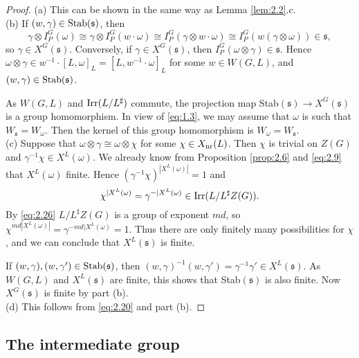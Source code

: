 \documentclass[11pt]{amsart}
\theoremstyle{definition}
\begin{document}
\begin{proof}
(a) This can be shown in the same way as Lemma \ref{lem:2.2}.c. \\
(b) If $(w,\gamma) \in {{\rm Stab}} ({{\mathfrak s}})$, then 
\[
\gamma \otimes I_P^G (\omega) \cong \gamma \otimes I_P^G (w \cdot \omega) \cong
I_P^G (\gamma \otimes w \cdot \omega) \cong I_P^G (w (\gamma \otimes \omega)) \in {{\mathfrak s}} ,
\]
so $\gamma \in X^G ({{\mathfrak s}})$. Conversely, if $\gamma \in X^G ({{\mathfrak s}})$, then 
$I_P^G (\omega \otimes \gamma) \in {{\mathfrak s}}$. Hence 
$\omega \otimes \gamma \in w^{-1} \cdot [L,\omega]_L = [L,w^{-1} \cdot \omega]_L$
for some $w \in W(G,L)$, and $(w,\gamma) \in {{\rm Stab}} ({{\mathfrak s}})$. 

As $W(G,L)$ and ${{\rm Irr}} (L / L^\sharp)$ commute, the projection map Stab$({{\mathfrak s}}) \to X^G ({{\mathfrak s}})$ 
is a group homomorphism. In view of \eqref{eq:1.3}, we may assume that $\omega$ is such 
that $W_{{\mathfrak s}} = W_\omega$. Then the kernel of this group homomorphism is $W_\omega = W_{{\mathfrak s}}$. \\
(c) Suppose that $\omega \otimes \gamma \cong \omega \otimes \chi$ for some 
$\chi \in X_{{\rm nr}}(L)$. Then $\chi$ is trivial on $Z(G)$ and $\gamma^{-1} \chi \in 
X^L (\omega)$. We already know from Proposition \ref{prop:2.6} and \eqref{eq:2.9} that 
$X^L (\omega)$ finite. Hence $(\gamma^{-1} \chi)^{|X^L (\omega)|} = 1$ and
\[
\chi^{|X^L (\omega)} = \gamma^{-|X^L (\omega)} \in {{\rm Irr}} (L / L^\sharp Z(G)) .
\]
By \eqref{eq:2.26} $L / L^\sharp Z(G)$ is a group of exponent $md$, so
$\chi^{md |X^L (\omega)|} = \gamma^{-md |X^L (\omega)} = 1$. Thus there are only finitely 
many possibilities for $\chi$, and we can conclude that $X^L ({{\mathfrak s}})$ is finite.

If $(w,\gamma), (w,\gamma') \in {{\rm Stab}} ({{\mathfrak s}})$, then $(w,\gamma)^{-1} (w,\gamma') =
\gamma^{-1} \gamma' \in X^L ({{\mathfrak s}})$. As $W(G,L)$ and $X^L ({{\mathfrak s}})$ are finite, this
shows that Stab$({{\mathfrak s}})$ is also finite. Now $X^G ({{\mathfrak s}})$ is finite by part (b).\\
(d) This follows from \eqref{eq:2.20} and part (b).
\end{proof}

\subsection{The intermediate group} \
\label{par:interm} 
\end{document}
